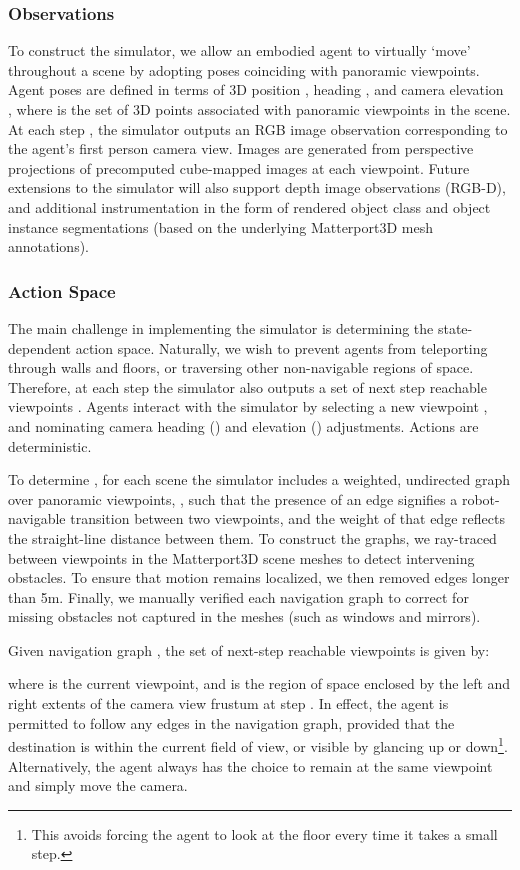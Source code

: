 \documentclass[10pt,twocolumn,letterpaper]{article}
\begin{document}
\subsubsection{Observations}
\label{sec:obs}
To construct the simulator, we allow an embodied agent to virtually `move' throughout a scene by adopting poses coinciding with panoramic viewpoints. Agent poses are defined in terms of 3D position , heading , and camera elevation , where  is the set of 3D points associated with panoramic viewpoints in the scene. At each step , the simulator outputs an RGB image observation  corresponding to the agent's first person camera view. Images are generated from perspective projections of precomputed cube-mapped images at each viewpoint. Future extensions to the simulator will also support depth image observations (RGB-D), and additional instrumentation in the form of rendered object class and object instance segmentations (based on the underlying Matterport3D mesh annotations). 
\subsubsection{Action Space}
\label{sec:action-space}
The main challenge in implementing the simulator is determining the state-dependent action space. Naturally, we wish to prevent agents from teleporting through walls and floors, or traversing other non-navigable regions of space. Therefore, at each step  the simulator also outputs a set of next step reachable viewpoints . Agents interact with the simulator by selecting a new viewpoint , and nominating camera heading () and elevation () adjustments. Actions are deterministic.

To determine , for each scene the simulator includes a weighted, undirected graph over panoramic viewpoints, , such that the presence of an edge signifies a robot-navigable transition between two viewpoints, and the weight of that edge reflects the straight-line distance between them. To construct the graphs, we ray-traced between viewpoints in the Matterport3D scene meshes to detect intervening obstacles. To ensure that motion remains localized, we then removed edges longer than 5m. Finally, we manually verified each navigation graph to correct for missing obstacles not captured in the meshes (such as windows and mirrors). 

Given navigation graph , the set of next-step reachable viewpoints is given by: 
\vspace{-2pt}

\noindent
where  is the current viewpoint, and  is the region of space enclosed by the left and right extents of the camera view frustum at step . In effect, the agent is permitted to follow any edges in the navigation graph, provided that the destination is within the current field of view, or visible by glancing up or down\footnote{This avoids forcing the agent to look at the floor every time it takes a small step.}. Alternatively, the agent always has the choice to remain at the same viewpoint and simply move the camera. 
\end{document}
